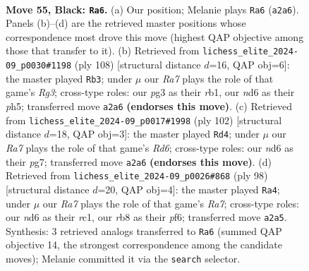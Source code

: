 \documentclass[11pt]{article}
\begin{document}
\clearpage

\begin{figure}[p]\centering
\begin{subfigure}{0.46\textwidth}\centering
\resizebox{\linewidth}{!}{%
\newchessgame
\chessboard[
  setfen={1R6/6p1/3N1pk1/7p/3P3P/6P1/r7/6K1 b - - 4 55},
  showmover=false,
  pgfstyle=straightmove, color=movearrow, markmove={a2-a6}
]}
\caption{}
\end{subfigure}\hfill
\begin{subfigure}{0.46\textwidth}\centering
\resizebox{\linewidth}{!}{%
\newchessgame
\chessboard[
  setfen={8/5p1k/8/4PK1p/5P1P/6R1/1p6/1r6 w - - 9 55},
  showmover=false,
  pgfstyle=straightmove, color=movearrow, markmove={g3-b3}
]}
\caption{}
\end{subfigure}
\\[4pt]
\begin{subfigure}{0.46\textwidth}\centering
\resizebox{\linewidth}{!}{%
\newchessgame
\chessboard[
  setfen={8/6pk/3R4/7p/5K1P/5PP1/r7/8 w - - 17 52},
  showmover=false,
  pgfstyle=straightmove, color=movearrow, markmove={d6-d4}
]}
\caption{}
\end{subfigure}\hfill
\begin{subfigure}{0.46\textwidth}\centering
\resizebox{\linewidth}{!}{%
\newchessgame
\chessboard[
  setfen={5k2/R7/5p1p/6p1/6P1/5P2/6PK/2r5 w - - 4 50},
  showmover=false,
  pgfstyle=straightmove, color=movearrow, markmove={a7-a4}
]}
\caption{}
\end{subfigure}
\caption{\textbf{Move 55, Black: \texttt{Ra6}.} (a) Our position; Melanie plays \texttt{Ra6} (\texttt{a2a6}). Panels (b)--(d) are the retrieved master positions whose correspondence most drove this move (highest QAP objective among those that transfer to it). (b) Retrieved from \texttt{lichess\_elite\_2024-09\_p0030\#1198} (ply 108) [structural distance $d$=16, QAP obj=6]: the master played \texttt{Rb3}; under $\mu$ our \emph{Ra7} plays the role of that game's \emph{Rg3}; cross-type roles: our \emph{p}g3 as their \emph{r}b1, our \emph{n}d6 as their \emph{p}h5; transferred move \texttt{a2a6} \textbf{(endorses this move)}. (c) Retrieved from \texttt{lichess\_elite\_2024-09\_p0017\#1998} (ply 102) [structural distance $d$=18, QAP obj=3]: the master played \texttt{Rd4}; under $\mu$ our \emph{Ra7} plays the role of that game's \emph{Rd6}; cross-type roles: our \emph{n}d6 as their \emph{p}g7; transferred move \texttt{a2a6} \textbf{(endorses this move)}. (d) Retrieved from \texttt{lichess\_elite\_2024-09\_p0026\#868} (ply 98) [structural distance $d$=20, QAP obj=4]: the master played \texttt{Ra4}; under $\mu$ our \emph{Ra7} plays the role of that game's \emph{Ra7}; cross-type roles: our \emph{n}d6 as their \emph{r}c1, our \emph{r}b8 as their \emph{p}f6; transferred move \texttt{a2a5}. Synthesis: 3 retrieved analogs transferred to \texttt{Ra6} (summed QAP objective 14, the strongest correspondence among the candidate moves); Melanie committed it via the \texttt{search} selector.}
\label{fig:thought-m109}
\end{figure}
\end{document}
